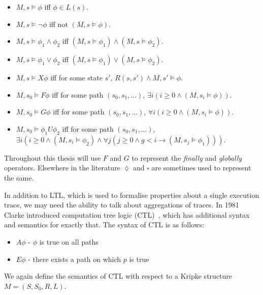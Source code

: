 \begin{itemize}
    \item $M, s \models \phi$ iff $\phi \in L(s)$.
    \item $M, s \models \lnot\phi$ iff not $(M, s \models \phi)$.
    \item $M, s \models \phi_1 \land \phi_2$ iff $(M, s \models \phi_1) \land (M, s \models \phi_2)$.
    \item $M, s \models \phi_1 \lor \phi_2$ iff $(M, s \models \phi_1) \lor (M, s \models \phi_2)$.
    \item $M, s \models X\phi$ iff for some state $s'$, $R(s, s') \land M, s' \models \phi$.
    \item $M, s_0 \models F\phi$ iff for some path $(s_0, s_1, ...)$, $\exists i (i \geq 0 \land (M, s_i \models \phi))$.
    \item $M, s_0 \models G\phi$ iff for some path $(s_0, s_1, ...)$, $\forall i (i \geq 0 \land (M, s_i \models \phi))$.
    \item $M, s_0 \models \phi_1 U \phi_2$ iff for some path $(s_0, s_1, ...)$, $\exists i (i \geq 0 \land (M, s_i \models \phi_2) \land \forall j (j \geq 0 \land g < i \to (M, s_j \models \phi_1)))$.
\end{itemize}

Throughout this thesis will use $F$ and $G$ to represent the \emph{finally} and
\emph{globally} operators. Elsewhere in the literature $\lozenge$ and $\square$
are sometimes used to represent the same.

In addition to LTL, which is used to formalise properties about a single
execution trace, we may need the ability to talk about aggregations of traces.
In 1981 Clarke introduced computation tree logic (CTL)~\cite{Clarke81}, which
has additional syntax and semantics for exactly that. The syntax of CTL is as
follows:

\begin{itemize}
    \item $A\phi$ - $\phi$ is true on all paths
    \item $E\phi$ - there exists a path on which $p$ is true
\end{itemize}

We again define the semantics of CTL with respect to a Kripke structure $M =
(S, S_0, R, L)$.

